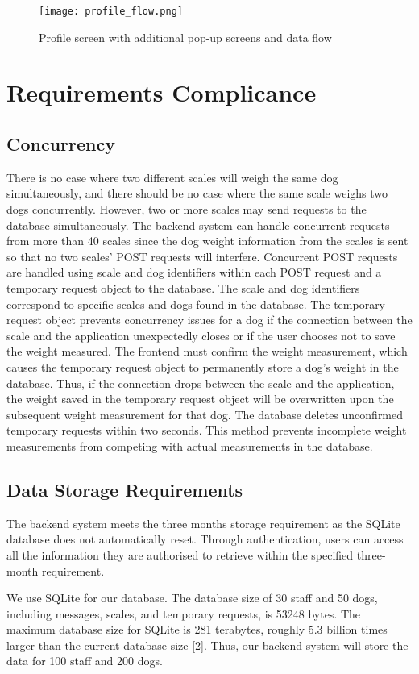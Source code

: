 \begin{figure}[!ht]
    \centering
    \texttt{[image: profile\_flow.png]}
    \caption{Profile screen with additional pop-up screens and data flow}
    \label{fig:mob_profile}
\end{figure}

\section{Requirements Complicance}

\subsection{Concurrency}

There is no case where two different scales will weigh the same dog simultaneously, and there should be no case where the same scale weighs two dogs concurrently. However, two or more scales may send requests to the database simultaneously. The backend system can handle concurrent requests from more than 40 scales since the dog weight information from the scales is sent so that no two scales’ POST requests will interfere. Concurrent POST requests are handled using scale and dog identifiers within each POST request and a temporary request object to the database. The scale and dog identifiers correspond to specific scales and dogs found in the database. The temporary request object prevents concurrency issues for a dog if the connection between the scale and the application unexpectedly closes or if the user chooses not to save the weight measured. The frontend must confirm the weight measurement, which causes the temporary request object to permanently store a dog’s weight in the database. Thus, if the connection drops between the scale and the application, the weight saved in the temporary request object will be overwritten upon the subsequent weight measurement for that dog. The database deletes unconfirmed temporary requests within two seconds. This method prevents incomplete weight measurements from competing with actual measurements in the database.


\subsection{Data Storage Requirements}

The backend system meets the three months storage requirement as the SQLite database does not automatically reset. Through authentication, users can access all the information they are authorised to retrieve within the specified three-month requirement.

We use SQLite for our database. The database size of 30 staff and 50 dogs, including messages, scales, and temporary requests, is 53248 bytes. The maximum database size for SQLite is 281 terabytes, roughly 5.3 billion times larger than the current database size [2]. Thus, our backend system will store the data for 100 staff and 200 dogs.


